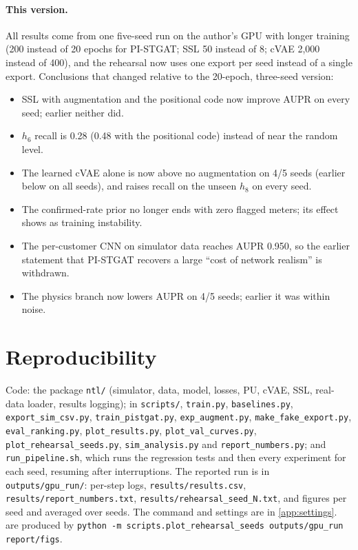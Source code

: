 \documentclass[11pt,a4paper]{article}
\theoremstyle{plain}
\theoremstyle{definition}
\theoremstyle{remark}
\begin{document}
\paragraph{This version.} All results come from one five-seed run on the author's GPU with longer training (200 instead of 20 epochs for PI-STGAT; SSL 50 instead of 8; cVAE 2{,}000 instead of 400), and the rehearsal now uses one export per seed instead of a single export. Conclusions that changed relative to the 20-epoch, three-seed version:
\begin{itemize}
\item SSL with augmentation and the positional code now improve AUPR on every seed; earlier neither did.
\item $h_6$ recall is 0.28 (0.48 with the positional code) instead of near the random level.
\item The learned cVAE alone is now above no augmentation on 4/5 seeds (earlier below on all seeds), and raises recall on the unseen $h_8$ on every seed.
\item The confirmed-rate prior no longer ends with zero flagged meters; its effect shows as training instability.
\item The per-customer CNN on simulator data reaches AUPR 0.950, so the earlier statement that PI-STGAT recovers a large ``cost of network realism'' is withdrawn.
\item The physics branch now lowers AUPR on 4/5 seeds; earlier it was within noise.
\end{itemize}

\section*{Reproducibility}
Code: the package \texttt{ntl/} (simulator, data, model, losses, PU, cVAE, SSL, real-data loader, results logging); in \texttt{scripts/}, \texttt{train.py}, \texttt{baselines.py}, \texttt{export\_sim\_csv.py}, \texttt{train\_pistgat.py}, \texttt{exp\_augment.py}, \texttt{make\_fake\_export.py}, \texttt{eval\_ranking.py}, \texttt{plot\_results.py}, \texttt{plot\_val\_curves.py}, \texttt{plot\_rehearsal\_seeds.py}, \texttt{sim\_analysis.py} and \texttt{report\_numbers.py}; and \texttt{run\_pipeline.sh}, which runs the regression tests and then every experiment for each seed, resuming after interruptions. The reported run is in \texttt{outputs/gpu\_run/}: per-step logs, \texttt{results/results.csv}, \texttt{results/report\_numbers.txt}, \texttt{results/rehearsal\_seed\_N.txt}, and figures per seed and averaged over seeds. The command and settings are in \cref{app:settings}.  are produced by \texttt{python -m scripts.plot\_rehearsal\_seeds outputs/gpu\_run report/figs}.
\end{document}
